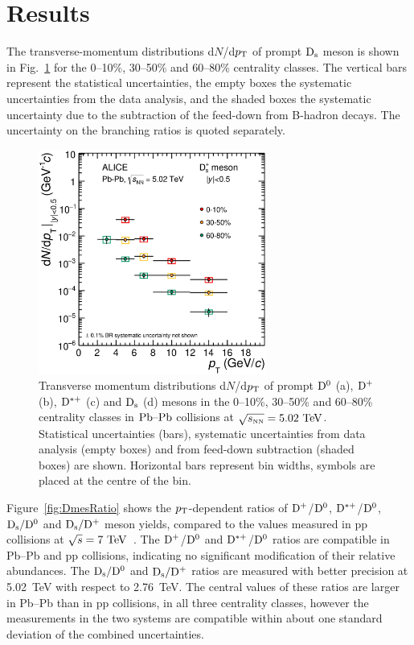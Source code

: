 \section{Results}

The transverse-momentum distributions d$N$/d$p_{\rm T}$ of prompt ${\rm D_s}$ meson 
is shown in Fig.~\ref{fig:DmesCorrYields010}
for the 0--10\%, 30--50\% and 60--80\% centrality classes. 
The vertical bars represent the statistical uncertainties, the empty boxes
the systematic uncertainties from the data analysis, and the shaded boxes
the systematic uncertainty due to the subtraction of the feed-down from 
B-hadron decays. The uncertainty on the branching ratios is quoted separately.%

\begin{figure}[!t]
 \begin{center}
\includegraphics[angle=0, width=7.5cm]{FigCap5/Ds_dNdpt_010_3050_6080.eps}
 \end{center}
 \caption{Transverse momentum distributions d$N$/d$p_{\rm T}$ of 
prompt ${\rm D^0}$ (a), ${\rm D^+}$ (b), ${\rm D^{*+}}$ (c) and ${\rm D_s}$ (d)  mesons in the 0--10\%, 30--50\% and 60--80\% 
centrality classes in $\mbox{Pb--Pb}$ collisions 
at $\sqrt{s_{\rm \scriptscriptstyle NN}}=5.02~\mathrm{TeV}$. 
Statistical uncertainties (bars), systematic uncertainties from data 
analysis (empty boxes) and from feed-down subtraction 
(shaded boxes) are shown. 
Horizontal bars represent bin widths, symbols are placed at the centre of 
the bin. }
 \label{fig:DmesCorrYields010} 
\end{figure} 



Figure~\ref{fig:DmesRatio} shows the $p_{\rm T}$-dependent ratios of
${\rm D^+}$/${\rm D^0}$, ${\rm D^{*+}}$/${\rm D^0}$, ${\rm D_s}/{\rm D^0}$ and ${\rm D_s}/{\rm D^+}$ meson yields, 
compared to the values measured in pp collisions at $\sqrt s=7~\mathrm{TeV}$~\cite{Acharya:2017jgo}. 
The ${\rm D^+}$/${\rm D^0}$ and ${\rm D^{*+}}$/${\rm D^0}$ ratios are compatible in Pb--Pb and pp collisions, 
indicating no significant modification of their relative abundances. 
The ${\rm D_s}/{\rm D^0}$ and ${\rm D_s}/{\rm D^+}$ ratios are measured with better precision at 5.02~TeV with respect to 2.76~TeV.
The central values of these ratios are larger in Pb--Pb than in pp collisions, in all three centrality classes, however
the measurements in the two systems are compatible within about one standard deviation of the combined uncertainties.
\iffalse

